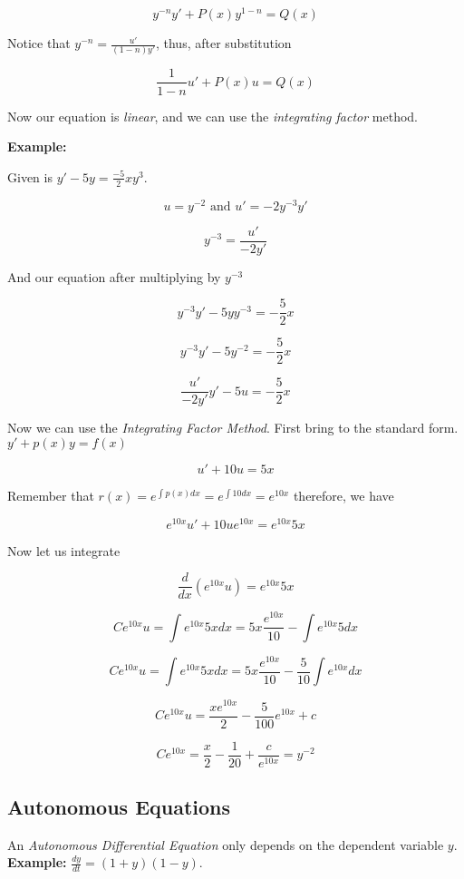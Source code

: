 \[
    y^{-n}y' + P(x)y^{1 - n} = Q(x)
\]


Notice that \(y^{-n} = \frac{u'}{(1-n)y'}\), thus, after substitution

\[
    \frac{1}{1 - n}u' + P(x)u = Q(x)
\]

Now our equation is \emph{linear}, and we can use the \emph{integrating factor} method.
\vspace{\baselineskip}

\textbf{Example: }
\vspace{\baselineskip}

Given is \(y' -5y = \frac{-5}{2}xy^3\).

\[
    u = y^{-2}  \text{ and } u' = -2y^{-3}y'
\]

\[
    y^{-3} = \frac{u'}{-2y'}
\]

And our equation after multiplying by \(y^{-3}\)

\[
    y^{-3}y' - 5yy^{-3} = -\frac{5}{2}x 
\]

\[
    y^{-3}y' - 5y^{-2} = -\frac{5}{2}x 
\]

\[
    \frac{u'}{-2y'}y' - 5u = -\frac{5}{2}x 
\]

Now we can use the \emph{Integrating Factor Method}. First bring to the standard form.
\(y' + p(x)y = f(x)\)

\[
  u' + 10u = 5x 
\]

Remember that \(r(x) = e^{\int p(x)dx} = e^{\int 10 dx} = e^{10x}\) therefore, we have

\[
    e^{10x}u' + 10ue^{10x} = e^{10x}5x
\]

Now let us integrate

\[
    \frac{d}{dx} \left(e^{10x}u\right) = e^{10x}5x
\]

\[
    Ce^{10x}u = \int e^{10x} 5x dx = 5x \frac{e^{10x}}{10} - \int e^{10x}5dx
\]

\[
    Ce^{10x}u = \int e^{10x} 5x dx = 5x \frac{e^{10x}}{10} - \frac{5}{10}\int e^{10x}dx
\]

\[
    Ce^{10x}u = \frac{xe^{10x}}{2} - \frac{5}{100} e^{10x} + c
\]

\[
    Ce^{10x} = \frac{x}{2} - \frac{1}{20} + \frac{c}{e^{10x}} = y^{-2}
\]

\subsection{Autonomous Equations}

An \emph{Autonomous Differential Equation} only depends on the dependent
variable \(y\).\textbf{ Example: } \(\frac{dy}{dt} = (1 + y)(1 -y)\).

